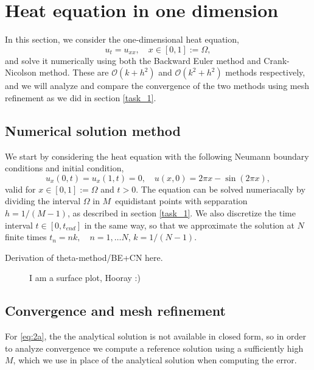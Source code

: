 \section{Heat equation in one dimension}
In this section, we consider the one-dimensional heat equation, 
\begin{equation*}
    u_t = u_{xx},   \quad x \in [0,1] := \Omega, 
    \label{eq:heat-eq}
\end{equation*}
and solve it numerically using both the Backward Euler method and Crank-Nicolson method. 
These are $\mathcal{O}(k+h^2)$ and $\mathcal{O}(k^2+h^2)$ methods respectively, 
and we will analyze and compare the convergence of the two methods using mesh refinement as we did in section \ref{task_1}. 

\subsection{Numerical solution method}
We start by considering the heat equation with the following Neumann boundary conditions and initial condition, 
\begin{equation*}
    u_x(0,t) = u_x(1,t) = 0, \quad u(x,0) = 2\pi x - \sin(2\pi x),
    \label{eq:2a}
\end{equation*}
valid for $x \in [0,1] := \Omega$ and $t > 0$. 
The equation can be solved numeriacally by dividing the interval $\Omega$ in $M$ equidistant points with sepparation $h=1/(M-1)$, 
as described in section \ref{task_1}.
We also discretize the time interval $t \in [0,t_{end}]$ in the same way, 
so that we approximate the solution at $N$ finite times $t_n = nk, \quad n = 1, \ldots N$, 
\quad $k = 1/(N-1)$.

\begin{figure}[ht]
    \centering
    
\end{figure}

Derivation of theta-method/BE+CN here.

\begin{figure}[ht]
    \centering
    
    \caption{I am a surface plot, Hooray :)}
\end{figure}

\subsection{Convergence and mesh refinement}
For \eqref{eq:2a}, the the analytical solution is not available in closed form, 
so in order to analyze convergence we compute a reference solution using a sufficiently high $M$, 
which we use in place of the analytical solution when computing the error. 

